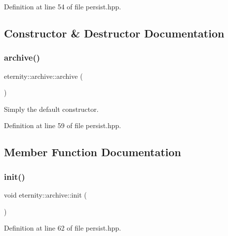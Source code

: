 Definition at line 54 of file persist.\+hpp.



\subsection{Constructor \& Destructor Documentation}
\mbox{\label{classeternity_1_1archive_adc5356f74fed2dd5daf230aa1ee6c58e}} 
\subsubsection{\texorpdfstring{archive()}{archive()}}
{\footnotesize\ttfamily eternity\+::archive\+::archive (\begin{DoxyParamCaption}{ }\end{DoxyParamCaption})\hspace{0.3cm}{\ttfamily [inline]}}



Simply the default constructor. 



Definition at line 59 of file persist.\+hpp.



\subsection{Member Function Documentation}
\mbox{\label{classeternity_1_1archive_a941c3b590afc929089706b92ce4d5e13}} 
\subsubsection{\texorpdfstring{init()}{init()}}
{\footnotesize\ttfamily void eternity\+::archive\+::init (\begin{DoxyParamCaption}{ }\end{DoxyParamCaption})\hspace{0.3cm}{\ttfamily [inline]}}



Definition at line 62 of file persist.\+hpp.

\mbox{\label{classeternity_1_1archive_af1ced5c2f5cd028d88033c40ac98cc71}} 
